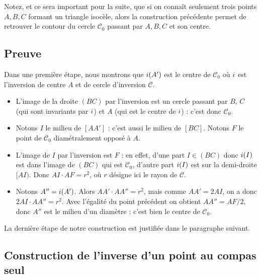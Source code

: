 \documentclass[11pt,class=report,crop=false]{standalone}
\begin{document}
\begin{remarque*}
Notez, et ce sera important pour la suite, que si on connaît seulement trois points $A,B,C$
formant un triangle isocèle, alors la construction précédente permet de retrouver le contour du cercle $\mathcal{C}_0$ 
passant par $A,B,C$ et son centre.
\end{remarque*}

\subsection{Preuve}

Dans une première étape, nous montrons que $i(A')$ est le centre
de $\mathcal{C}_0$ où $i$ est l'inversion de centre $A$ et de cercle d'inversion
$\mathcal{C}$.

\begin{itemize}
 \item L'image de la droite $(BC)$ par l'inversion est un cercle passant par $B$, $C$ (qui sont invariants par $i$) et $A$ (qui est le centre de $i$) : c'est donc $\mathcal{C}_0$.
 
 \item Notons $I$ le milieu de $[AA']$ : c'est aussi le milieu de $[BC]$.
 Notons $F$ le point de $\mathcal{C}_0$ diamétralement opposé à $A$.
 
 \item L'image de $I$ par l'inversion est $F$ : en effet, d'une part $I \in (BC)$ donc
 $i(I)$ est dans l'image de $(BC)$ qui est $\mathcal{C}_0$, d'autre part $i(I)$ est sur la demi-droite $[AI)$. 
 Donc $AI \cdot AF = r^2$,
 où $r$ désigne ici le rayon de $\mathcal{C}$.
 
 \item Notons $A''=i(A')$. Alors $AA' \cdot AA''= r^2$, mais comme $AA' = 2 AI$, on a 
 donc $2 AI\cdot AA''= r^2$. Avec l'égalité du point précédent on obtient $AA'' = AF/2$, donc $A''$ est le milieu d'un diamètre : c'est bien le centre de $\mathcal{C}_0$.
\end{itemize}

La dernière étape de notre construction est justifiée dans le paragraphe suivant.

\subsection{Construction de l'inverse d'un point au compas seul}
\label{ssec:invcompas}
\end{document}

